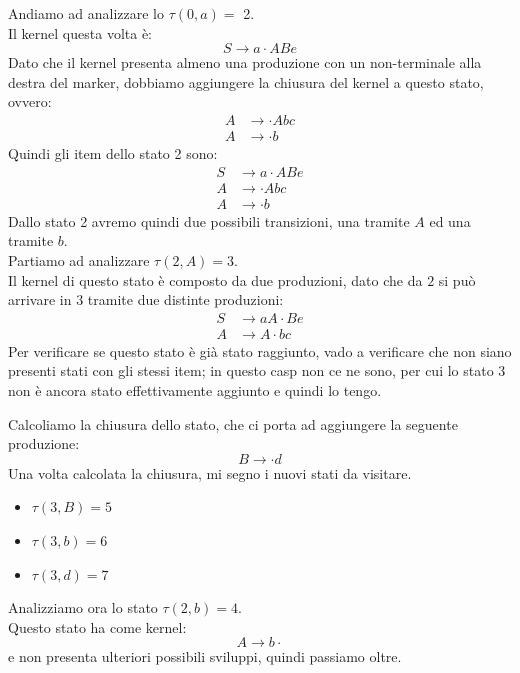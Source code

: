 \documentclass[class=book, crop=false, oneside, 12pt]{standalone}
\begin{document}
Andiamo ad analizzare lo \(\tau (0, a) =\) 2. \\
Il kernel questa volta è:
\begin{equation*}
    S \to a \cdot ABe
\end{equation*}
Dato che il kernel presenta almeno una produzione con un non-terminale alla destra del marker, dobbiamo aggiungere la chiusura del kernel a questo stato, ovvero:
\begin{align*}
    A &\to \cdot Abc\\
	A &\to \cdot b
\end{align*}
Quindi gli item dello stato 2 sono:
\begin{align*}
    S &\to a \cdot ABe\\
    A &\to \cdot Abc\\
	A &\to \cdot b
\end{align*}
Dallo stato 2 avremo quindi due possibili transizioni, una tramite \(A\) ed una tramite \(b\). \\

Partiamo ad analizzare \(\tau (2, A) = 3\). \\
Il kernel di questo stato è composto da due produzioni, dato che da \(2\) si può arrivare in \(3\) tramite due distinte produzioni:
\begin{align*}
    S &\to aA \cdot Be \\
    A &\to A \cdot bc
\end{align*}
Per verificare se questo stato è già stato raggiunto, vado a verificare che non siano presenti stati con gli stessi item; in questo casp non ce ne sono, per cui lo stato \(3\) non è ancora stato effettivamente aggiunto e quindi lo tengo.

Calcoliamo la chiusura dello stato, che ci porta ad aggiungere la seguente produzione:
\begin{equation*}
    B \to \cdot d
\end{equation*}
Una volta calcolata la chiusura, mi segno i nuovi stati da visitare.
\begin{itemize}
    \item \(\tau (3, B) = 5\)
    \item \(\tau (3, b) = 6\)
    \item \(\tau (3, d) = 7\)
\end{itemize}

Analizziamo ora lo stato \(\tau (2, b) = 4\). \\
Questo stato ha come kernel:
\begin{equation*}
    A \to b \cdot
\end{equation*}
e non presenta ulteriori possibili sviluppi, quindi passiamo oltre. \\
\end{document}

